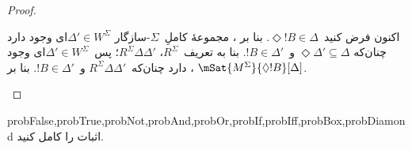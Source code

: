 \documentclass[../../../include/open-logic-section]{subfiles}
\begin{document}
\begin{proof}
\begin{enumerate}
{{{          اکنون فرض کنید~$\Diamond !B \in \Delta$. بنا بر
          ، مجموعهٔ کاملِ~$\Sigma$-سازگار
          $\Delta' \in W^\Sigma$ای وجود دارد چنان‌که
          $\Diamond \Delta' \subseteq \Delta$ و~$!B \in
          \Delta'$. بنا به تعریف~$R^\Sigma$،
          $R^\Sigma \Delta\Delta'$؛ پس~$\Delta' \in W^\Sigma$ای وجود
          دارد چنان‌که~$R^\Sigma \Delta\Delta'$ و~$!B \in \Delta'$.
          بنا بر ،
          $\mSat{M^\Sigma}{\Diamond !B}[\Delta]$.}}}{}
  \end{enumerate}
\end{proof}

\begin{probtag}{probFalse,probTrue,probNot,probAnd,probOr,probIf,probIff,probBox,probDiamond}
  اثبات  را کامل کنید.
\end{probtag}
\end{document}
